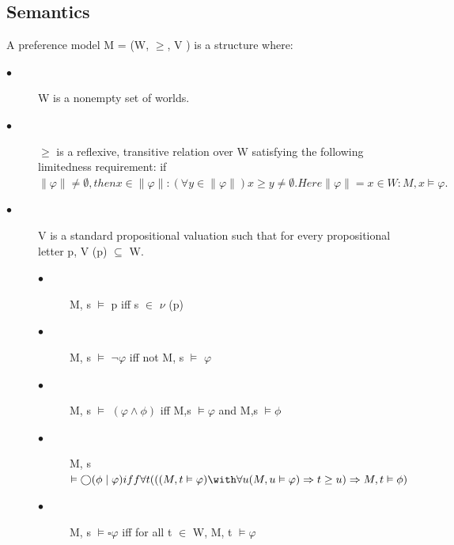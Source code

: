 \documentclass{article}
\begin{document}
\subsection{Semantics}
A preference model M = (W, $\geq$, V ) is a structure where:
\begin{description}
\item[$\bullet$ ] W is a nonempty set of worlds.
\item[$\bullet $] $ \geq$ is a reflexive, transitive relation over W satisfying the following limitedness requirement: if $\|\varphi\| \neq \emptyset, then {x\in\|\varphi\| : (\forall y \in \|\varphi\|)x\geq y} \neq \emptyset. Here\|\varphi\| = {x \in W : M, x\vDash \varphi}.$
\item[$\bullet$]V is a standard propositional valuation such that for every propositional letter p, V (p) $\subseteq$ W.
\begin{description}
\item[$\bullet$ ]M, s $ \vDash $ p iff s $\in$ $\nu$  (p)
\item[$\bullet$ ]M, s $ \vDash $ $\neg \varphi$ iff not M, s $ \vDash $ $\varphi$
\item[$\bullet$ ]M, s $ \vDash $ $(\varphi\land\phi )$ iff M,s $ \vDash \varphi$ and  M,s $ \vDash \phi$
\item[$\bullet$ ]M, s $ \vDash  \bigcirc(\phi\mid\varphi) iff \forall t(((M, t \vDash \varphi)\with\forall u(M, u \vDash \varphi) \Rightarrow t \geq u) \Rightarrow M, t \vDash \phi)$
\item[$\bullet$ ]M, s $ \vDash  \square\varphi$ iff for all t $\in$ W, M, t $\vDash \varphi$
\end{description}
\end{description}
\end{document}
